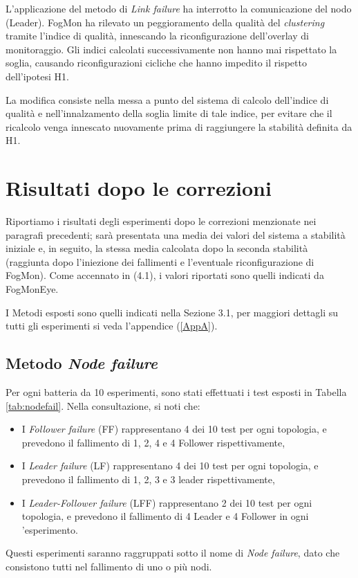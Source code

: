         L'applicazione del metodo di \textit{Link failure} ha interrotto la comunicazione del nodo (Leader). FogMon ha rilevato un peggioramento della qualità del \textit{clustering} tramite l'indice di qualità, innescando la riconfigurazione dell'overlay di monitoraggio. Gli indici calcolati successivamente non hanno mai rispettato la soglia, causando riconfigurazioni cicliche che hanno impedito il rispetto dell'ipotesi H1.
        
        La modifica consiste nella messa a punto del sistema di calcolo dell'indice di qualità e nell'innalzamento della soglia limite di tale indice, per evitare che il ricalcolo venga innescato nuovamente prima di raggiungere la stabilità definita da H1.
    \newpage   
    \section{Risultati dopo le correzioni}
    Riportiamo i risultati degli esperimenti dopo le correzioni menzionate nei paragrafi precedenti; sarà presentata una media dei valori del sistema a stabilità iniziale e, in seguito, la stessa media calcolata  dopo la seconda stabilità (raggiunta dopo l'iniezione dei fallimenti e l'eventuale riconfigurazione di FogMon). Come accennato in (4.1), i valori riportati sono quelli indicati da FogMonEye.
    
    I Metodi esposti sono quelli indicati nella Sezione 3.1, per maggiori dettagli su tutti gli esperimenti si veda l'appendice (\ref{AppA}).
        \subsection{Metodo \textit{Node failure}}
        Per ogni batteria da 10 esperimenti, sono stati effettuati i test esposti in Tabella \ref{tab:nodefail}. Nella consultazione, si noti che:
        \begin{itemize}
            \item I \textit{Follower failure} (FF) rappresentano 4 dei 10 test per ogni topologia, e prevedono il fallimento di 1, 2, 4 e 4 Follower rispettivamente,
            \item I \textit{Leader failure} (LF) rappresentano 4 dei 10 test per ogni topologia, e prevedono il fallimento di 1, 2, 3 e 3 leader rispettivamente,
            \item I \textit{Leader-Follower failure} (LFF) rappresentano 2 dei 10 test per ogni topologia, e prevedono il fallimento di 4 Leader e 4 Follower in ogni 'esperimento.
        \end{itemize}
        Questi esperimenti saranno raggruppati sotto il nome di \textit{Node failure}, dato che consistono tutti nel fallimento di uno o più nodi.
        
